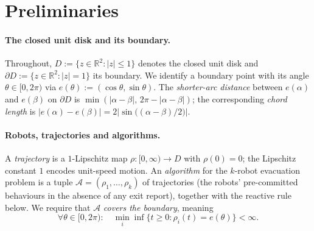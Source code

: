 \documentclass[11pt]{article}
\theoremstyle{plain}
\theoremstyle{definition}
\theoremstyle{remark}
\begin{document}
\section{Preliminaries}
\label{sec:prelim}

\paragraph{The closed unit disk and its boundary.} Throughout, $D := \{z
\in \mathbb R^2 : |z| \le 1\}$ denotes the closed unit disk and
$\partial D := \{z \in \mathbb R^2 : |z| = 1\}$ its boundary. We identify
a boundary point with its angle $\theta \in [0, 2\pi)$ via
$e(\theta) := (\cos\theta, \sin\theta)$. The \emph{shorter-arc distance}
between $e(\alpha)$ and $e(\beta)$ on $\partial D$ is
$\min(|\alpha - \beta|,\, 2\pi - |\alpha - \beta|)$; the corresponding
\emph{chord length} is $|e(\alpha) - e(\beta)| = 2\lvert\sin\!\bigl((\alpha
- \beta)/2\bigr)\rvert$.

\paragraph{Robots, trajectories and algorithms.} A \emph{trajectory} is a
$1$-Lipschitz map $\rho : [0, \infty) \to D$ with $\rho(0) = 0$; the
Lipschitz constant $1$ encodes unit-speed motion. An
\emph{algorithm} for the $k$-robot evacuation problem is a tuple
$\mathcal A = (\rho_1, \ldots, \rho_k)$ of trajectories (the robots'
pre-committed behaviours in the absence of any exit report), together
with the reactive rule below. We require that $\mathcal A$ \emph{covers
the boundary}, meaning
\[
\forall \theta \in [0, 2\pi) : \quad
\min_{i} \inf\{t \ge 0 : \rho_i(t) = e(\theta)\} < \infty.
\]
\end{document}
